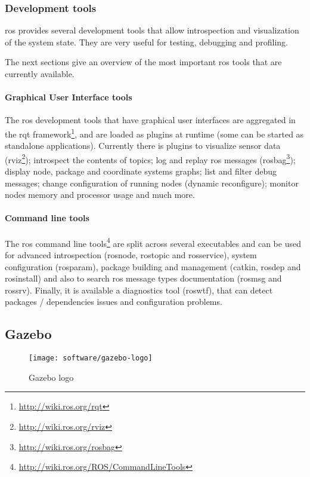 \subsubsection{Development tools}

\gls{ros} provides several development tools that allow introspection and visualization of the system state. They are very useful for testing, debugging and profiling.

The next sections give an overview of the most important \gls{ros} tools that are currently available.


\paragraph{Graphical User Interface tools}

The \gls{ros} development tools that have graphical user interfaces are aggregated in the rqt framework\footnote{\url{http://wiki.ros.org/rqt}}, and are loaded as plugins at runtime (some can be started as standalone applications). Currently there is plugins to visualize sensor data (rviz\footnote{\url{http://wiki.ros.org/rviz}}); introspect the contents of topics; log and replay \gls{ros} messages (rosbag\footnote{\url{http://wiki.ros.org/rosbag}}); display node, package and coordinate systems graphs; list and filter debug messages; change configuration of running nodes (dynamic reconfigure); monitor nodes memory and processor usage and much more.


\paragraph{Command line tools}

The \gls{ros} command line tools\footnote{\url{http://wiki.ros.org/ROS/CommandLineTools}} are split across several executables and can be used for advanced introspection (rosnode, rostopic and rosservice), system configuration (rosparam), package building and management (catkin, rosdep and rosinstall) and also to search \gls{ros} message types documentation (rosmsg and rossrv). Finally, it is available a diagnostics tool (roswtf), that can detect packages / dependencies issues and configuration problems.


\subsection{Gazebo}

\begin{wrapfigure}{r}{0.23\textwidth}
	\centering
	\vspace*{-2em}
	\texttt{[image: software/gazebo-logo]}
	\caption{Gazebo logo}
	\label{fig:gazebo-logo}
\end{wrapfigure}


